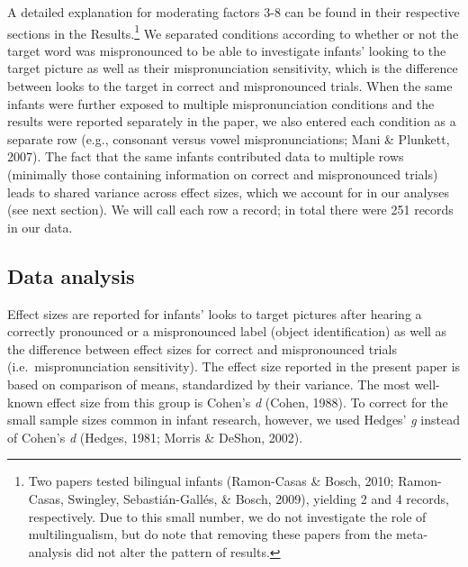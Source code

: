 \documentclass[man]{apa6}
\let\rmarkdownfootnote\footnote%
\def\footnote{\protect\rmarkdownfootnote}
\begin{document}
A detailed explanation for moderating factors 3-8 can be found in their respective sections in the Results.\footnote{Two papers tested bilingual infants (Ramon-Casas \& Bosch, 2010; Ramon-Casas, Swingley, Sebastián-Gallés, \& Bosch, 2009), yielding 2 and 4 records, respectively. Due to this small number, we do not investigate the role of multilingualism, but do note that removing these papers from the meta-analysis did not alter the pattern of results.} We separated conditions according to whether or not the target word was mispronounced to be able to investigate infants' looking to the target picture as well as their mispronunciation sensitivity, which is the difference between looks to the target in correct and mispronounced trials. When the same infants were further exposed to multiple mispronunciation conditions and the results were reported separately in the paper, we also entered each condition as a separate row (e.g., consonant versus vowel mispronunciations; Mani \& Plunkett, 2007). The fact that the same infants contributed data to multiple rows (minimally those containing information on correct and mispronounced trials) leads to shared variance across effect sizes, which we account for in our analyses (see next section). We will call each row a record; in total there were 251 records in our data.

\hypertarget{data-analysis}{%
\subsection{Data analysis}\label{data-analysis}}

Effect sizes are reported for infants' looks to target pictures after hearing a correctly pronounced or a mispronounced label (object identification) as well as the difference between effect sizes for correct and mispronounced trials (i.e.~mispronunciation sensitivity). The effect size reported in the present paper is based on comparison of means, standardized by their variance. The most well-known effect size from this group is Cohen's \emph{d} (Cohen, 1988). To correct for the small sample sizes common in infant research, however, we used Hedges' \emph{g} instead of Cohen's \emph{d} (Hedges, 1981; Morris \& DeShon, 2002).
\end{document}
